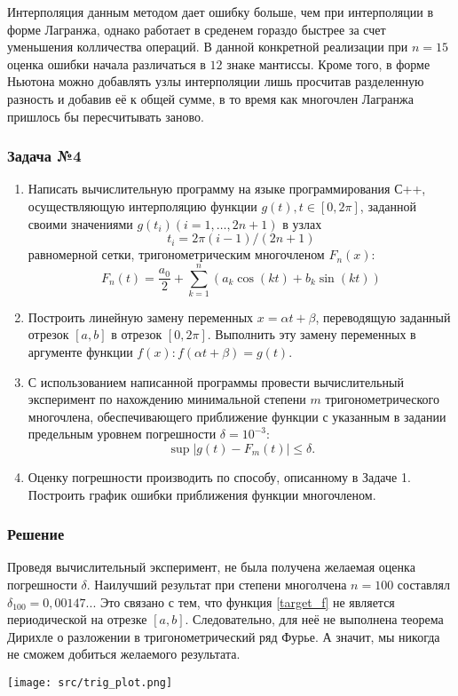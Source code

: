 \documentclass[a4paper, fontsize=14pt]{article}
\begin{document}
    Интерполяция данным методом дает ошибку больше, чем при интерполяции в форме Лагранжа, однако работает в среденем гораздо быстрее за счет уменьшения колличества операций.
    В данной конкретной реализации при $n=15$ оценка ошибки начала различаться в $12$ знаке мантиссы. 
    Кроме того, в форме Ньютона можно добавлять узлы интерполяции лишь просчитав разделенную разность и добавив её к общей сумме, в то время как многочлен Лагранжа пришлось бы пересчитывать заново.

    \subsubsection*{Задача №4}
    \begin{enumerate}
        \item Написать вычислительную программу на языке программирования С++, осуществляющую интерполяцию функции $g(t), t\in[0,2\pi]$, заданной своими значениями $g(t_i) (i=1,\dots,2n+1)$ в узлах $$t_i=2 \pi (i-1)/(2n+1)$$ равномерной сетки, тригонометрическим многочленом $F_n(x)$:
        \begin{equation*}
            F_n(t)=\frac{a_0}{2}+\sum_{k=1}^{n} \left( a_k  \cos(kt)+b_k \sin(kt) \right)
        \end{equation*}
        \item Построить линейную замену переменных $x=\alpha t+ \beta$, переводящую заданный отрезок $[a,b]$ в отрезок $[0,2\pi]$. Выполнить эту замену переменных в аргументе функции $f(x): f(\alpha t+\beta) = g(t)$.
        \item С использованием написанной программы провести вычислительный эксперимент по нахождению минимальной степени $m$ тригонометрического многочлена, обеспечивающего приближение функции с указанным в задании предельным уровнем погрешности $\delta = 10^{-3}$:
        \begin{equation*}
            \operatorname{sup} |g(t)-F_m (t)| \leq \delta.
        \end{equation*}
        \item Оценку погрешности производить по способу, описанному в Задаче 1. Построить график ошибки приближения функции многочленом.
    \end{enumerate}
    
    \subsubsection*{Решение}
    Проведя вычислительный эксперимент, не была получена желаемая оценка погрешности $\delta$. Наилучший результат при степени многолчена $n=100$ составлял $\delta_{100} = 0,00147..$. Это связано с тем, что функция \eqref{target_f} не является периодической на отрезке $[a, b]$. Следовательно, для неё не выполнена теорема Дирихле о разложении в тригонометрический ряд Фурье. А значит, мы никогда не сможем добиться желаемого результата.
    \begin{center}
        \texttt{[image: src/trig\_plot.png]}
    \end{center}
    
\end{document}
